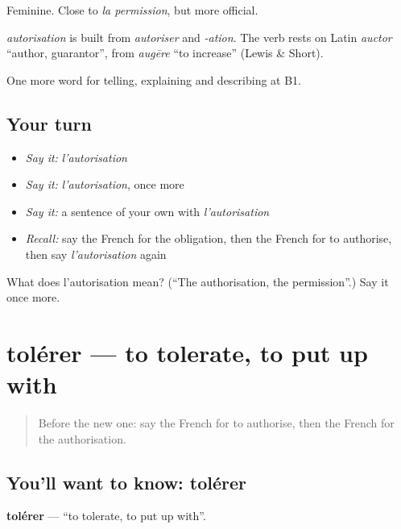 Feminine. Close to \emph{la permission}, but more official.

\begin{cousinweb}
\emph{autorisation} is built from \emph{autoriser} and \emph{-ation}. The verb rests on Latin \emph{auctor} \textquotedblleft{}author, guarantor\textquotedblright{}, from \emph{augēre} \textquotedblleft{}to increase\textquotedblright{} (Lewis \& Short).
\end{cousinweb}

\begin{grammarlens}[title={What you've built}]
One more word for telling, explaining and describing at B1.
\end{grammarlens}

\subsection*{Your turn}
\begin{itemize}
\raggedright
  \item \emph{Say it:} \emph{l'autorisation}
  \item \emph{Say it:} \emph{l'autorisation}, once more
  \item \emph{Say it:} a sentence of your own with \emph{l'autorisation}
  \item \emph{Recall:} say the French for the obligation, then the French for to authorise, then say \emph{l'autorisation} again
\end{itemize}

\begin{tcolorbox}[breakable,colback=teal!4,colframe=teal!35!black,title={Before you move on}]
What does l'autorisation mean? (\textquotedblleft{}The authorisation, the permission\textquotedblright{}.) Say it once more.
\end{tcolorbox}
\section[tolérer]{tolérer — to tolerate, to put up with}

\label{lesson:FR-C381-tolerer}



\begin{quote}
Before the new one: say the French for to authorise, then the French for the authorisation.
\end{quote}

\subsection*{You'll want to know: tolérer}
\textbf{tolérer} — \textquotedblleft{}to tolerate, to put up with\textquotedblright{}.

